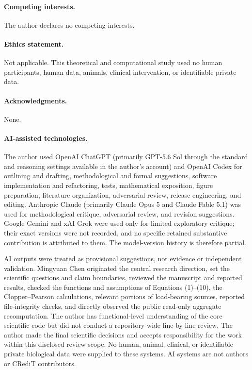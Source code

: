 \documentclass[10pt]{article}
\theoremstyle{definition}
\begin{document}
\paragraph{Competing interests.}
The author declares no competing interests.

\paragraph{Ethics statement.}
Not applicable. This theoretical and computational study used no human participants, human data,
animals, clinical intervention, or identifiable private data.

\paragraph{Acknowledgments.}
None.

\paragraph{AI-assisted technologies.}
The author used OpenAI ChatGPT (primarily GPT-5.6 Sol through the standard and reasoning settings
available in the author's account) and OpenAI Codex for outlining and drafting, methodological and
formal suggestions, software implementation and refactoring, tests, mathematical exposition,
figure preparation, literature organization, adversarial review, release engineering, and
editing. Anthropic Claude (primarily Claude Opus 5 and Claude Fable 5.1) was used for methodological
critique, adversarial review, and revision suggestions. Google Gemini and xAI Grok were used only
for limited exploratory critique; their exact versions were not recorded, and no specific
retained substantive contribution is attributed to them. The model-version history is therefore
partial.

AI outputs were treated as provisional suggestions, not evidence or independent validation.
Mingyuan Chen originated the central research direction, set the scientific questions and claim
boundaries, reviewed the manuscript and reported results, checked the functions and assumptions of
Equations (1)--(10), the Clopper--Pearson calculations, relevant portions of load-bearing sources,
reported file-integrity checks, and directly observed the public read-only aggregate
recomputation. The author has functional-level understanding of the core scientific code but did
not conduct a repository-wide line-by-line review. The author made the final scientific decisions
and accepts responsibility for the work within this disclosed review scope. No human, animal,
clinical, or identifiable private biological data were supplied to these systems. AI systems are
not authors or CRediT contributors.
\end{document}
